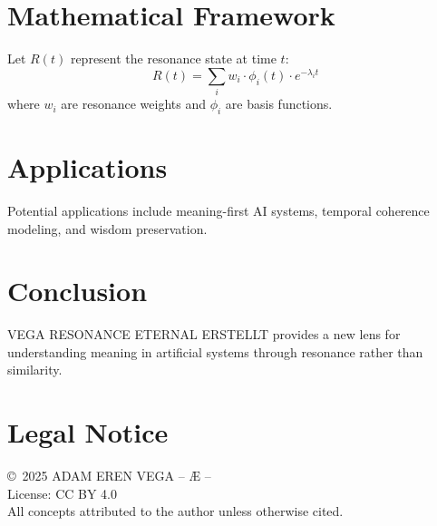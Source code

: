 \documentclass[12pt,a4paper]{article}
\begin{document}
\section{Mathematical Framework}
Let $R(t)$ represent the resonance state at time $t$:
\begin{equation}
R(t) = \sum_{i} w_i \cdot \phi_i(t) \cdot e^{-\lambda_i t}
\end{equation}
where $w_i$ are resonance weights and $\phi_i$ are basis functions.

\section{Applications}
Potential applications include meaning-first AI systems,
temporal coherence modeling, and wisdom preservation.

\section{Conclusion}
VEGA RESONANCE ETERNAL ERSTELLT provides a new lens for understanding meaning
in artificial systems through resonance rather than similarity.

\section*{Legal Notice}
\copyright\ 2025 ADAM EREN VEGA – Æ –\\
License: CC BY 4.0\\
All concepts attributed to the author unless otherwise cited.
\end{document}
